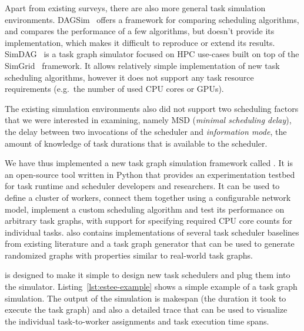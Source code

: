 Apart from existing surveys, there are also more general task simulation environments.
DAGSim~\cite{dagsim} offers a framework for comparing scheduling algorithms, and compares
the performance of a few algorithms, but doesn't provide its implementation, which makes it
difficult to reproduce or extend its results. SimDAG~\cite{simdag} is a task graph
simulator focused on HPC use-cases built on top of the SimGrid~\cite{simgrid} framework. It
allows relatively simple implementation of new task scheduling algorithms, however it does not
support any task resource requirements (e.g.\ the number of used CPU cores or GPUs).

The existing simulation environments also did not support two scheduling factors that we were
interested in examining, namely MSD (\emph{minimal scheduling delay}), the delay between two invocations of
the scheduler and \emph{information mode}, the amount of knowledge of task durations that is
available to the scheduler.

We have thus implemented a new task graph simulation framework called \estee{}. It is
an open-source tool written in Python that provides an experimentation
testbed for task runtime and scheduler developers and researchers. It can be used to define a
cluster of workers, connect them together using a configurable network model, implement a custom
scheduling algorithm and test its performance on arbitrary task graphs, with support for specifying
required CPU core counts for individual tasks. \estee{} also contains implementations
of several task scheduler baselines from existing literature and a task graph generator that can be
used to generate randomized graphs with properties similar to real-world task graphs.

\estee{} is designed to make it simple to design new task schedulers and plug them into the simulator.
Listing~\ref{lst:estee-example} shows a simple example of a task graph simulation. The output of the
simulation is makespan (the duration it took to execute the task graph) and also a detailed trace
that can be used to visualize the individual task-to-worker assignments and task execution time spans.

